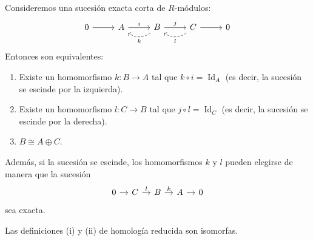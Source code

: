 \begin{prop}
Consideremos una sucesión exacta corta de $R$-módulos:
\[
\begin{tikzcd}[column sep=2.6em]
0 \arrow[r] & A \arrow[r, "i"] & B \arrow[r, "j"] \arrow[l, dashed, bend left=38, "k"] & C \arrow[r] \arrow[l, dashed, bend left=38, "l"] & 0
\end{tikzcd}
\]
Entonces son equivalentes:
\begin{enumerate}
    \item Existe un homomorfismo $k \colon B \to A$ tal que $k \circ i = \operatorname{Id}_A$ (es decir, la sucesión se escinde por la izquierda).
    \item Existe un homomorfismo $l \colon C \to B$ tal que $j \circ l = \operatorname{Id}_C$ (es decir, la sucesión se escinde por la derecha).
    \item $B \cong A \oplus C$.
\end{enumerate}
Además, si la sucesión se escinde, los homomorfismos $k$ y $l$ pueden elegirse de manera que la sucesión
\[
\begin{tikzcd}[column sep=1em]
0 \arrow[r] & C \arrow[r, "l"] & B \arrow[r, "k"] & A \arrow[r] & 0
\end{tikzcd}
\]
sea exacta.
\end{prop}

\begin{prop}
Las definiciones \textup{(i)} y \textup{(ii)} de homología reducida son isomorfas.
\end{prop}

